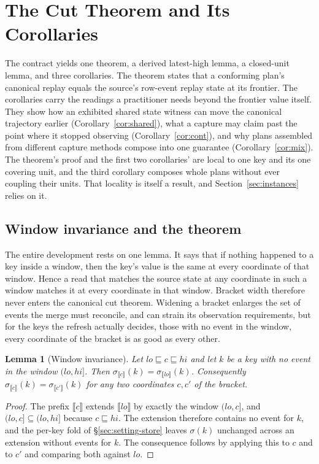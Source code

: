 \documentclass[sigconf,nonacm,10pt]{acmart}
\theoremstyle{plain}
\newtheorem{lemma}{Lemma}[section]
\theoremstyle{definition}
\newcommand{\den}[1]{\llbracket #1 \rrbracket}   %
\newcommand{\pre}{\sqsubseteq}                   %
\newcommand{\window}[2]{(#1,#2]}                 %
\begin{document}
\section{The Cut Theorem and Its Corollaries}\label{sec:theorem}

The contract yields one theorem, a derived latest-high lemma, a
closed-unit lemma, and three corollaries. The
theorem states that a conforming plan's canonical replay equals the
source's row-event replay state at its frontier. The corollaries carry
the readings a practitioner needs beyond the frontier value itself.
They show how an exhibited shared state witness can move the canonical
trajectory earlier (Corollary~\ref{cor:shared}), what a capture may claim past the point
where it stopped observing (Corollary~\ref{cor:cont}), and why plans
assembled from different capture methods compose into one guarantee
(Corollary~\ref{cor:mix}). The theorem's proof and the first two corollaries' are local to
one key and its one covering unit, and the third corollary composes whole
plans without ever coupling their units. That locality is itself a result, 
and Section~\ref{sec:instances} relies on it.

\subsection{Window invariance and the theorem}\label{sec:theorem-cut}

The entire development rests on one lemma. It says that if nothing
happened to a key inside a window, then the key's value is the same
at every coordinate of that window. Hence a read that matches 
the source state at any coordinate in such a window matches it at every coordinate in that window.
Bracket width therefore never enters the canonical cut theorem.
Widening a bracket enlarges the set of events the merge must
reconcile, and can strain its observation requirements, but for the keys
the refresh actually decides, those with no event in the window,
every coordinate of the bracket is as good as every other.

\begin{lemma}[Window invariance]\label{lem:inv}
Let $lo \pre c \pre hi$ and let $k$ be a key with no event in the
window $\window{lo}{hi}$. Then
$\sigma_{\den{c}}(k) = \sigma_{\den{lo}}(k)$. Consequently
$\sigma_{\den{c}}(k) = \sigma_{\den{c'}}(k)$ for any two coordinates
$c, c'$ of the bracket.
\end{lemma}

\begin{proof}
The prefix $\den{c}$ extends $\den{lo}$ by exactly the window
$\window{lo}{c}$, and $\window{lo}{c} \subseteq \window{lo}{hi}$
because $c \pre hi$. The extension therefore contains no event for
$k$, and the per-key fold of \S\ref{sec:setting-store} leaves
$\sigma(k)$ unchanged across an extension without events for $k$. The
consequence follows by applying this to $c$ and to $c'$ and comparing
both against $lo$.
\end{proof}
\end{document}

